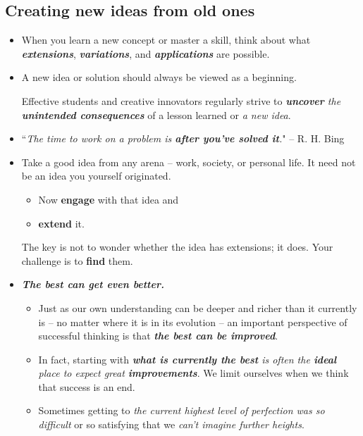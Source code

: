 \documentclass[11pt]{article}
\begin{document}
\subsection{Creating new ideas from old ones}
\begin{itemize}
\item When you learn a new concept or master a skill, think about what \emph{\textbf{extensions}}, \emph{\textbf{variations}}, and \emph{\textbf{applications}} are possible.

\item A new idea or solution should always be viewed as a beginning. 

Effective students and creative innovators regularly strive to \emph{\textbf{uncover} the \textbf{unintended consequences}} of a lesson learned or \emph{a new idea}.

\item ``\emph{The time to work on a problem is \textbf{after you’ve solved it}.}" -- R. H. Bing

\item \begin{exercise}
Take a good idea from any arena -- work, society, or personal life. It need not be an idea you yourself originated.
\begin{itemize}
\item Now \textbf{engage} with that idea and 
\item \textbf{extend} it.
\end{itemize} 
The key is not to wonder whether the idea has extensions; it does. Your challenge is to \textbf{find} them.
\end{exercise}

\item \emph{\textbf{The best can get even better.}}
\begin{itemize}
\item Just as our own understanding can be deeper and richer than it currently is -- no matter where it is in its evolution -- an important perspective of successful thinking is that \emph{\textbf{the best can be improved}}. 

\item In fact, starting with \emph{\textbf{what is currently the best} is often the \textbf{ideal} place to expect great \textbf{improvements}}. We limit ourselves when we think that success is an end.

\item Sometimes getting to \emph{the current highest level of perfection was so difficult} or so satisfying that we \emph{can’t imagine further heights}. 


\end{itemize}
\end{itemize}
\end{document}
